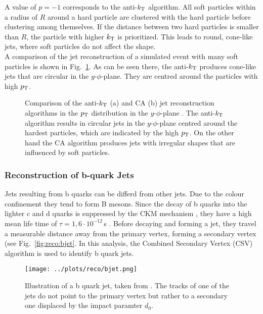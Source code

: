 \noindent A value of $p=-1$ corresponds to the anti-$k_{\rm T}$ algorithm. All soft particles within a radius of $R$ around a hard particle are clustered with the hard particle before clustering among themselves. If the distance between two hard particles is smaller than $R$, the particle with higher $k_{\rm T}$ is prioritized. This leads to round, cone-like jets, where soft particles do not affect the shape.\\

\noindent A comparison of the jet reconstruction of a simulated event with many soft particles is shown in Fig.~\ref{fig:eventreco:jet_reco}. As can be seen there, the anti-$k_{\rm T}$ produces cone-like jets that are circular in the $y$-$\phi$-plane. They are centred around the particles with high $p_{\rm T}$.
\begin{figure}
	\centering
	\caption[Comparison of the anti-$k_{\rm T}$ and CA jet reconstruction algorithms]{Comparison of the anti-$k_{\rm T}$ (a) and CA (b) jet reconstruction algorithms in the $p_{\rm T}$ distribution in the $y$-$\phi$-plane \cite{antikt}. The anti-$k_{\rm T}$ algorithm results in circular jets in the $y$-$\phi$-plane centred around the hardest particles, which are indicated by the high $p_{\rm T}$. On the other hand the CA algorithm produces jets with irregular shapes that are influenced by soft particles.}
	\label{fig:eventreco:jet_reco}
\end{figure}

\subsubsection*{Reconstruction of b-quark Jets}
Jets resulting from b quarks can be differd from other jets. Due to the colour confinement they tend to form B mesons. Since the decay of b quarks into the lighter c and d quarks is suppressed by the CKM mechanism \cite{CKM}, they have a high mean life time of $\tau=1,6\cdot 10^{-12}$\,s \cite{PDG}. Before decaying and forming a jet, they travel a measurable distance away from the primary vertex, forming a secondary vertex (see Fig.~\ref{fig:reco:bjet}. In this analysis, the Combined Secondary Vertex (CSV) algorithm is used to identify b quark jets.
\begin{figure}
    \centering
    \texttt{[image: ../plots/reco/bjet.png]}
    \caption[Illustration of a b quark jet]{Illustration of a b quark jet, taken from \cite{bjet}. The tracks of one of the jets do not point to the primary vertex but rather to a secondary one displaced by the impact paramter $d_0$.}
\end{figure}

